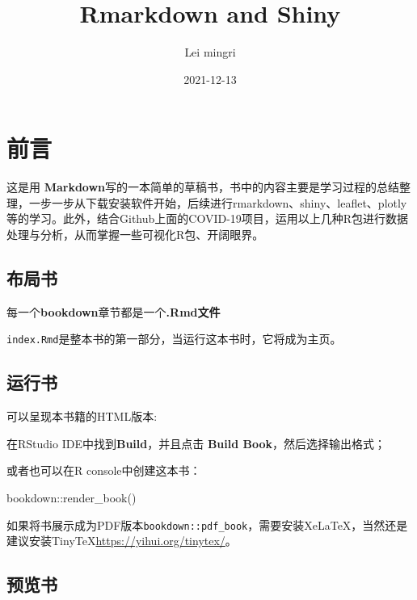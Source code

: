 \documentclass[
]{book}
\title{Rmarkdown and Shiny}
\author{Lei mingri}
\date{2021-12-13}
\newenvironment{Shaded}{\begin{snugshade}}{\end{snugshade}}
\newcommand{\FunctionTok}[1]{\textcolor[rgb]{0.00,0.00,0.00}{#1}}
\newcommand{\NormalTok}[1]{#1}
\newcommand{\SpecialCharTok}[1]{\textcolor[rgb]{0.00,0.00,0.00}{#1}}
\begin{document}
\maketitle

{
\setcounter{tocdepth}{1}
\tableofcontents
}
\hypertarget{ux524dux8a00}{%
\chapter{前言}\label{ux524dux8a00}}

这是用 \textbf{Markdown}写的一本简单的草稿书，书中的内容主要是学习过程的总结整理，一步一步从下载安装软件开始，后续进行rmarkdown、shiny、leaflet、plotly等的学习。此外，结合Github上面的COVID-19项目，运用以上几种R包进行数据处理与分析，从而掌握一些可视化R包、开阔眼界。

\hypertarget{ux5e03ux5c40ux4e66}{%
\section{布局书}\label{ux5e03ux5c40ux4e66}}

每一个\textbf{bookdown}章节都是一个\textbf{.Rmd文件}

\texttt{index.Rmd}是整本书的第一部分，当运行这本书时，它将成为主页。

\hypertarget{ux8fd0ux884cux4e66}{%
\section{运行书}\label{ux8fd0ux884cux4e66}}

可以呈现本书籍的HTML版本:

在RStudio IDE中找到\textbf{Build}，并且点击 \textbf{Build Book}，然后选择输出格式；

或者也可以在R console中创建这本书：

\begin{Shaded}
\begin{Highlighting}[]
\NormalTok{bookdown}\SpecialCharTok{::}\FunctionTok{render\_book}\NormalTok{()}
\end{Highlighting}
\end{Shaded}

如果将书展示成为PDF版本\texttt{bookdown::pdf\_book}，需要安装XeLaTeX，当然还是建议安装TinyTeX\url{https://yihui.org/tinytex/}。

\hypertarget{ux9884ux89c8ux4e66}{%
\section{预览书}\label{ux9884ux89c8ux4e66}}
\end{document}
